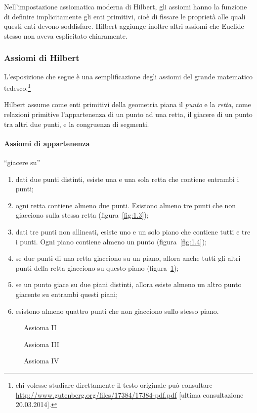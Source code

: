 Nell'impostazione assiomatica moderna di Hilbert, gli assiomi hanno la funzione di definire implicitamente gli enti primitivi, cioè di fissare le proprietà alle quali questi enti devono soddisfare. Hilbert aggiunge inoltre altri assiomi che Euclide stesso non aveva esplicitato chiaramente.

\subsubsection*{Assiomi di Hilbert}\label{sect:ass_Hilbert}

L'esposizione che segue è una semplificazione degli assiomi del grande matematico tedesco.\footnote{chi volesse studiare direttamente il testo originale può consultare \url{http://www.gutenberg.org/files/17384/17384-pdf.pdf} [ultima consultazione 20.03.2014].}

Hilbert assume come enti primitivi della geometria piana il \emph{punto} e la \emph{retta}, come relazioni primitive l'appartenenza di un punto ad una retta, il giacere di un punto tra altri due punti, e la congruenza di segmenti.

\paragraph{Assiomi di appartenenza} ``giacere su''
\begin{enumerate}[label=\Roman{*}.]
\item dati due punti distinti, esiste una e una sola retta che contiene entrambi i punti;
\item ogni retta contiene almeno due punti. Esistono almeno tre punti che non giacciono sulla stessa retta (figura~\ref{fig:1.3});
\item dati tre punti non allineati, esiste uno e un solo piano che contiene tutti e tre i punti. Ogni piano contiene almeno un punto (figura~\ref{fig:1.4});
\item se due punti di una retta giacciono su un piano, allora anche tutti gli altri punti della retta giacciono su questo piano (figura~\ref{fig:1.5});
\item se un punto giace su due piani distinti, allora esiste almeno un altro punto giacente su entrambi questi piani;
\item esistono almeno quattro punti che non giacciono sullo stesso piano.
\end{enumerate}

\begin{figure}[b,t,h]
 \begin{minipage}[b]{.32\textwidth}
 \centering
 
 \caption{Assioma II}\label{fig:1.3}
 \end{minipage}
 \begin{minipage}[b]{.32\textwidth}
 \centering
 
 \caption{Assioma III}\label{fig:1.4}
 \end{minipage}
 \begin{minipage}[b]{.32\textwidth}
 \centering
 
 \caption{Assioma IV}\label{fig:1.5}
 \end{minipage}
\end{figure}

